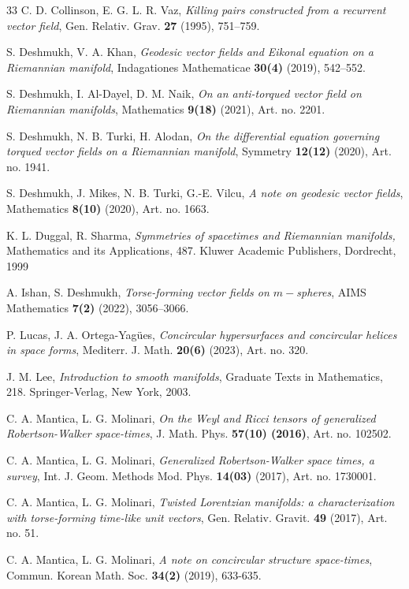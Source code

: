 \documentclass[12pt]{amsart}
\theoremstyle{definition}
\begin{document}
\begin{thebibliography}{33}
 C. D. Collinson, E. G. L. R. Vaz, {\it Killing pairs constructed from a recurrent vector field},  Gen. Relativ. Grav. {\bf 27} (1995), 751--759.

 S. Deshmukh, V. A. Khan, {\it Geodesic vector fields and Eikonal equation on a Riemannian manifold}, Indagationes Mathematicae {\bf 30(4)} (2019), 542--552.

 S. Deshmukh, I. Al-Dayel, D. M. Naik, {\it On an anti-torqued vector field on Riemannian manifolds}, Mathematics {\bf 9(18)} (2021), Art. no. 2201. 

 S. Deshmukh, N. B. Turki, H. Alodan, {\it On the differential equation governing torqued
vector fields on a Riemannian manifold}, Symmetry {\bf 12(12)} (2020), Art. no. 1941.

 S. Deshmukh, J. Mikes, N. B. Turki, G.-E. Vilcu, {\it A note on geodesic vector fields}, Mathematics {\bf 8(10)} (2020), Art. no. 1663.

 K. L. Duggal, R. Sharma, {\it Symmetries of spacetimes and Riemannian manifolds,} Mathematics and its Applications, 487. Kluwer Academic Publishers, Dordrecht, 1999

  A. Ishan, S. Deshmukh, {\it Torse-forming vector fields on $m-$spheres}, AIMS Mathematics {\bf 7(2)} (2022), 3056--3066.

 P. Lucas, J. A. Ortega-Yag\"ues, {\it Concircular hypersurfaces and concircular helices in space forms}, Mediterr. J. Math. {\bf 20(6)} (2023), Art. no. 320.

 J. M. Lee, {\it Introduction to smooth manifolds}, Graduate Texts in Mathematics, 218. Springer-Verlag, New York, 2003.

 C. A. Mantica, L. G. Molinari, {\it On the Weyl and Ricci tensors of generalized Robertson-Walker space-times}, J. Math. Phys. {\bf 57(10) (2016)}, Art. no. 102502.

 C. A. Mantica, L. G. Molinari, {\it Generalized Robertson-Walker space times, a survey}, Int. J. Geom. Methods Mod. Phys. {\bf 14(03)} (2017), Art. no. 1730001.

 C. A. Mantica, L. G. Molinari, {\it Twisted Lorentzian manifolds: a characterization with torse-forming time-like unit vectors}, Gen. Relativ. Gravit. {\bf 49} (2017), Art. no. 51.

 C. A. Mantica, L. G. Molinari, {\it A note on concircular structure space-times}, Commun. Korean Math. Soc. {\bf 34(2)} (2019), 633-635.


\end{thebibliography}
\end{document}
